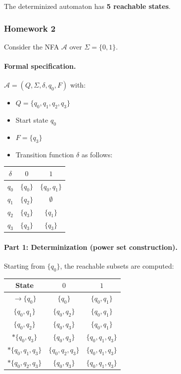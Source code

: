 \documentclass{article}
\theoremstyle{theorem}
\theoremstyle{definition}
\theoremstyle{remark}
\begin{document}
The determinized automaton has \textbf{5 reachable states}.

\subsubsection*{Homework 2}

Consider the NFA $\mathcal{A}$ over $\Sigma = \{0,1\}$.

\paragraph{Formal specification.}

$\mathcal{A} = (Q, \Sigma, \delta, q_0, F)$ with:
\begin{itemize}
\item $Q = \{q_0, q_1, q_2, q_3\}$
\item Start state $q_0$
\item $F = \{q_3\}$
\item Transition function $\delta$ as follows:
\end{itemize}

\begin{center}
\begin{tabular}{c|cc}
$\delta$ & $0$ & $1$ \\ \hline
$q_0$ & $\{q_0\}$ & $\{q_0,q_1\}$ \\
$q_1$ & $\{q_2\}$ & $\emptyset$ \\
$q_2$ & $\{q_3\}$ & $\{q_1\}$ \\
$q_3$ & $\{q_3\}$ & $\{q_3\}$
\end{tabular}
\end{center}

\paragraph{Part 1: Determinization (power set construction).}

Starting from $\{q_0\}$, the reachable subsets are computed:

\begin{center}
\begin{tabular}{c|cc}
State & $0$ & $1$ \\ \hline
$\to \{q_0\}$ & $\{q_0\}$ & $\{q_0,q_1\}$ \\
$\{q_0,q_1\}$ & $\{q_0,q_2\}$ & $\{q_0,q_1\}$ \\
$\{q_0,q_2\}$ & $\{q_0,q_3\}$ & $\{q_0,q_1\}$ \\
$*\{q_0,q_3\}$ & $\{q_0,q_3\}$ & $\{q_0,q_1,q_3\}$ \\
$*\{q_0,q_1,q_3\}$ & $\{q_0,q_2,q_3\}$ & $\{q_0,q_1,q_3\}$ \\
$*\{q_0,q_2,q_3\}$ & $\{q_0,q_3\}$ & $\{q_0,q_1,q_3\}$
\end{tabular}
\end{center}
\end{document}
